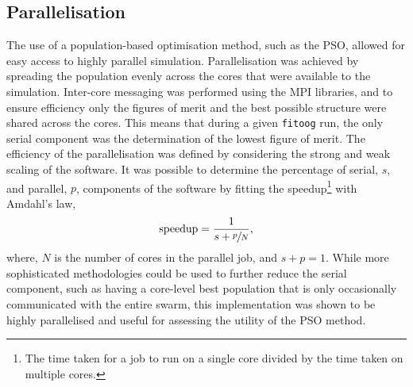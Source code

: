 \subsection{Parallelisation}
\label{sec:para}
The use of a population-based optimisation method, such as the PSO, allowed for easy access to highly parallel simulation.
Parallelisation was achieved by spreading the population evenly across the cores that were available to the simulation.
Inter-core messaging was performed using the MPI libraries, and to ensure efficiency only the figures of merit and the best possible structure were shared across the cores.
This means that during a given \texttt{fitoog} run, the only serial component was the determination of the lowest figure of merit.
The efficiency of the parallelisation was defined by considering the strong and weak scaling of the software.
It was possible to determine the percentage of serial, $s$, and parallel, $p$, components of the software by fitting the speedup\footnote{The time taken for a job to run on a single core divided by the time taken on multiple cores.} with Amdahl's law,
%
\begin{equation}
\text{speedup} = \frac{1}{s + \sfrac{p}{N}},
\end{equation}
%
where, $N$ is the number of cores in the parallel job, and $s + p = 1$.
While more sophisticated methodologies could be used to further reduce the serial component, such as having a core-level best population that is only occasionally communicated with the entire swarm, this implementation was shown to be highly parallelised and useful for assessing the utility of the PSO method.
